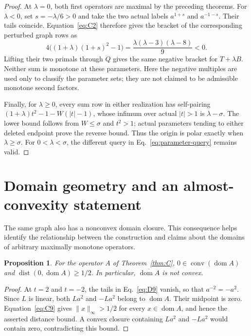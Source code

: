 \documentclass[11pt]{article}
\newcommand{\dom}{\operatorname{dom}}
\newtheorem{proposition}{Proposition}
\begin{document}
\begin{proof}
At $\lambda=0$, both first operators are maximal by the preceding
theorems. For $\lambda<0$, set $s=-\lambda/6>0$ and take the two actual
labels $a^{1+s}$ and $a^{-1-s}$. Their tails coincide. Equation~\eqref{eq:C2}
therefore gives the bracket of the corresponding perturbed graph rows as
\begin{equation}
4\big((1+\lambda)(1+s)^2-1\big)
=\frac{\lambda(\lambda-3)(\lambda-8)}9<0.
\label{eq:parameter-negative}
\end{equation}
Lifting their two primals through $Q$ gives the same negative bracket
for $T+\lambda B$. Neither sum is monotone at these parameters.
Here the negative multiples are used only to classify the parameter
sets; they are not claimed to be admissible monotone second factors.

Finally, for $\lambda\ge0$, every sum row in either realization has
self-pairing
$(1+\lambda)t^2-1-W(|t|-1)$, whose infimum over actual $|t|>1$ is
$\lambda-\sigma$. The lower bound follows from $W\le\sigma$ and
$t^2>1$; actual parameters tending to either deleted endpoint prove
the reverse bound. Thus the origin is polar exactly when
$\lambda\ge\sigma$. For $0<\lambda<\sigma$, the different query in
Eq.~\eqref{eq:parameter-query} remains valid.
\end{proof}
\fi

\section{Domain geometry and an almost-convexity statement}
\label{sec:domain-comparison}
The same graph also has a nonconvex domain closure. This consequence
helps identify the relationship between the construction and claims
about the domains of arbitrary maximally monotone operators.

\begin{proposition}\label{prop:domain-gap}
For the operator $A$ of Theorem~\ref{thm:C},
$0\in\operatorname{conv}(\dom A)$ and
$\operatorname{dist}(0,\dom A)\ge1/2$.
In particular, $\overline{\dom A}$ is not convex.
\end{proposition}
\begin{proof}
At $t=2$ and $t=-2$, the tails in Eq.~\eqref{eq:D9} vanish, so that
$a^{-2}=-a^2$. Since $L$ is linear, both $La^2$ and $-La^2$ belong
to $\dom A$. Their midpoint is zero. Equation~\eqref{eq:C9} gives
$\|x\|_\infty>1/2$ for every $x\in\dom A$, and hence the asserted
distance bound. A convex closure containing $La^2$ and $-La^2$ would
contain zero, contradicting this bound.
\end{proof}
\end{document}

